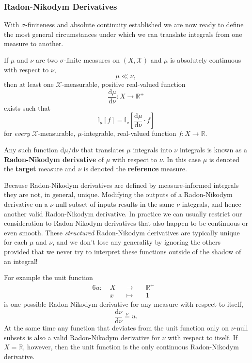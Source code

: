 \documentclass[
  letterpaper,
  DIV=11,
  numbers=noendperiod]{scrartcl}
\begin{document}
\hypertarget{radon-nikodym-derivatives}{%
\subsubsection{Radon-Nikodym
Derivatives}\label{radon-nikodym-derivatives}}

With \(\sigma\)-finiteness and absolute continuity established we are
now ready to define the most general circumstances under which we can
translate integrals from one measure to another.

If \(\mu\) and \(\nu\) are two \(\sigma\)-finite measures on
\((X, \mathcal{X})\) and \(\mu\) is absolutely continuous with respect
to \(\nu\), \[
\mu \ll \nu,
\] then at least one \(\mathcal{X}\)-measurable, positive real-valued
function \[
\frac{ \mathrm{d} \mu }{ \mathrm{d} \nu } : X \rightarrow \mathbb{R}^{+}
\] exists such that \[
\mathbb{I}_{\mu}[f] =
\mathbb{I}_{\nu} \left[
\frac{ \mathrm{d} \mu }{ \mathrm{d} \nu } \cdot f
\right]
\] for \emph{every} \(\mathcal{X}\)-measurable, \(\mu\)-integrable,
real-valued function \(f : X \rightarrow \mathbb{R}\).

Any such function \(\mathrm{d} \mu / \mathrm{d} \nu\) that translates
\(\mu\) integrals into \(\nu\) integrals is known as a
\textbf{Radon-Nikodym derivative} of \(\mu\) with respect to \(\nu\). In
this case \(\mu\) is denoted the \textbf{target} measure and \(\nu\) is
denoted the \textbf{reference} measure.

Because Radon-Nikodym derivatives are defined by measure-informed
integrals they are not, in general, unique. Modifying the outputs of a
Radon-Nikodym derivative on a \(\nu\)-null subset of inputs results in
the same \(\nu\) integrals, and hence another valid Radon-Nikodym
derivative. In practice we can usually restrict our consideration to
Radon-Nikodym derivatives that also happen to be continuous or even
smooth. These \emph{structured} Radon-Nikodym derivatives are typically
unique for each \(\mu\) and \(\nu\), and we don't lose any generality by
ignoring the others provided that we never try to interpret these
functions outside of the shadow of an integral!

For example the unit function \begin{alignat*}{6}
u :\; & X & &\rightarrow& \; & \mathbb{R}^{+} &
\\
& x & &\mapsto& & 1 &
\end{alignat*} is one possible Radon-Nikodym derivative for any measure
with respect to itself, \[
\frac{ \mathrm{d} \nu }{ \mathrm{d} \nu }
\overset{\nu}{=}
u.
\] At the same time any function that deviates from the unit function
only on \(\nu\)-null subsets is also a valid Radon-Nikodym derivative
for \(\nu\) with respect to itself. If \(X = \mathbb{R}\), however, then
the unit function is the only continuous Radon-Nikodym derivative.
\end{document}

